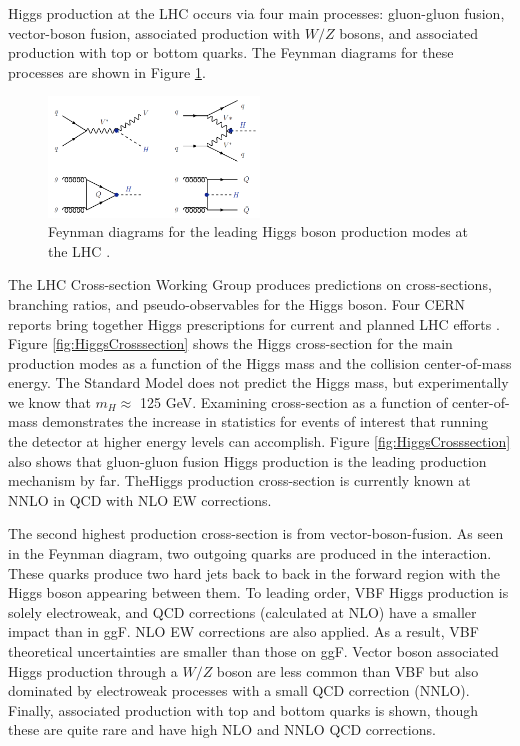 Higgs production at the LHC occurs via four main processes: gluon-gluon fusion, vector-boson fusion, associated production with $W/Z$ bosons, and associated production with top or bottom quarks. The Feynman diagrams for these processes are shown in Figure \ref{fig:FeynmannHiggs}.  

\begin{figure}[H]
        \centering
    \includegraphics[width=0.5\textwidth] {Pictures/FeynmannHiggs.png}\hspace{1cm}
    \caption{Feynman diagrams for the leading Higgs boson production modes at the LHC \cite{Djouadi}.}
    \label{fig:FeynmannHiggs}
\end{figure}

The LHC Cross-section Working Group produces predictions on cross-sections, branching ratios, and pseudo-observables for the Higgs boson. Four CERN reports bring together Higgs prescriptions for current and planned LHC efforts \cite{LHCCrossSectionWG}. Figure \ref{fig:HiggsCrosssection} shows the Higgs cross-section for the main production modes as a function of the Higgs mass and the collision center-of-mass energy. The Standard Model does not predict the Higgs mass, but experimentally we know that $m_H\approx$ 125 GeV. Examining cross-section as a function of center-of-mass demonstrates the increase in statistics for events of interest that running the detector at higher energy levels can accomplish. Figure \ref{fig:HiggsCrosssection} also shows that gluon-gluon fusion Higgs production is the leading production mechanism by far. TheHiggs production cross-section is currently known at NNLO in QCD with NLO EW corrections. 

The second highest production cross-section is from vector-boson-fusion. As seen in the Feynman diagram, two outgoing quarks are produced in the interaction. These quarks produce two hard jets back to back in the forward region with the Higgs boson appearing between them. To leading order, VBF Higgs production is solely electroweak, and QCD corrections (calculated at NLO) have a smaller impact than in ggF. NLO EW corrections are also applied. As a result, VBF theoretical uncertainties are smaller than those on ggF. Vector boson associated Higgs production through a $W/Z$ boson are less common than VBF but also dominated by electroweak processes with a small QCD correction (NNLO). Finally, associated production with top and bottom quarks is shown, though these are quite rare and have high NLO and NNLO QCD corrections. 

